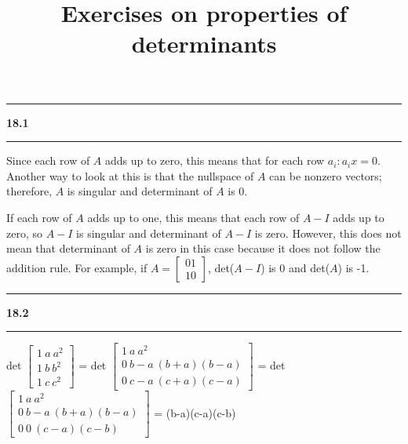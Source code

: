 \documentclass[11pt]{article}
\newcommand\question[2]{\vspace{.25in}\hrule\textbf{#1 #2}\vspace{.5em}\hrule\vspace{.10in}}
\begin{document}
\raggedright
\newcommand\NAME{Haiying Cui}  %
\newcommand\ANDREWID{Christy}     %
\newcommand\HWNUM{18}              %

\title{Exercises on properties of determinants}
\maketitle

\question{18.1}{}
Since each row of \(A\) adds up to zero, this means that for each row \(a_i: a_ix = 0\). Another way to look at this is that the nullspace of \(A\) can be nonzero vectors; therefore, \(A\) is singular and determinant of \(A\) is 0.

If each row of \(A\) adds up to one, this means that each row of \(A - I\) adds up to zero, so \(A - I\) is singular and determinant of \(A-I\) is zero. However, this does not mean that determinant of \(A\) is zero in this case because it does not follow the addition rule. For example, if \(A = \begin{bmatrix} 0 1 \\ 1 0 \end{bmatrix}\), det(\(A - I\)) is 0 and det(\(A\)) is -1.
\question{18.2}{}
det \(\begin{bmatrix} 1 \ a \ a^2 \\ 1 \ b \ b^2 \\ 1 \ c \ c^2 \end{bmatrix}\) = det \(\begin{bmatrix} 1 \ a \ a^2 \\ 0 \ b-a \ (b+a)(b-a) \\ 0 \ c-a \ (c+a)(c-a) \end{bmatrix}\) = det \(\begin{bmatrix} 1 \ a \ a^2 \\ 0 \ b-a \ (b+a)(b-a) \\ 0 \ 0 \ (c-a)(c-b) \end{bmatrix}\) = (b-a)(c-a)(c-b)
\end{document}
